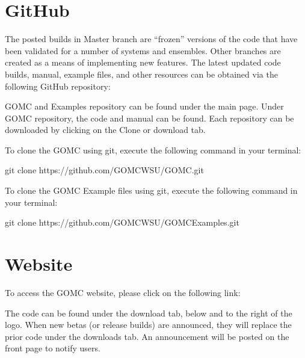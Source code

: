 \documentclass[letterpaper,10pt,english]{sphinxmanual}
\begin{document}
\section{GitHub}
\label{\detokenize{download:github}}
The posted builds in Master branch are “frozen” versions of the code that have been validated for a number of systems and ensembles. Other branches are created as a means of implementing new features. The latest updated code builds, manual, example files, and other resources can be obtained via the following GitHub repository:


\noindent{}

GOMC and Examples repository can be found under the main page. Under GOMC repository, the code and manual can be found. Each repository can be downloaded by clicking on the Clone or download tab.

\noindent{}

To clone the GOMC using git, execute the following command in your terminal:

\begin{sphinxVerbatim}[commandchars=\\\{\}]
\PYGZdl{} git clone https://github.com/GOMC\PYGZhy{}WSU/GOMC.git
\end{sphinxVerbatim}

To clone the GOMC Example files using git, execute the following command in your terminal:

\begin{sphinxVerbatim}[commandchars=\\\{\}]
\PYGZdl{} git clone https://github.com/GOMC\PYGZhy{}WSU/GOMC\PYGZus{}Examples.git
\end{sphinxVerbatim}


\section{Website}
\label{\detokenize{download:website}}
To access the GOMC website, please click on the following link:

The code can be found under the download tab, below and to the right of the logo. When new betas (or release builds) are announced, they will replace the prior code under the downloads tab. An announcement will be posted on the front page to notify users.
\end{document}
